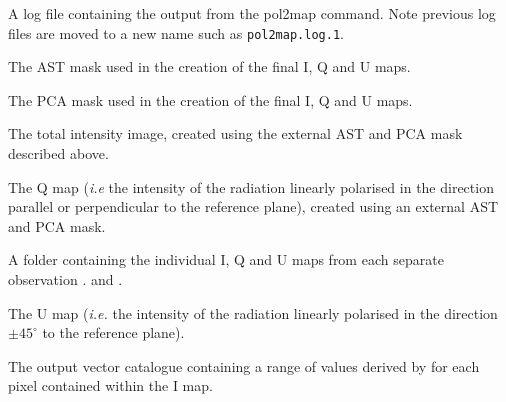 \begin{aligndesc}
\item[\file{pol2map.log}] A log file containing the output from the
  pol2map command. Note previous log files are moved to a new name
  such as \texttt{pol2map.log.1}.

\item[\file{astmask.sdf}] The AST mask used in the creation
  of the final I, Q and U maps.

\item[\file{pcamask.sdf}] The PCA mask used in the creation of the
  final I, Q and U maps.

\item[\file{iext.sdf}] The total intensity image, created using the
  external AST and PCA mask described above.

\item[\file{qext.sdf}] The Q map (\emph{i.e} the intensity of the radiation
  linearly polarised in the direction parallel or perpendicular to the
  reference plane), created using an external AST and PCA mask.

\item[\file{maps/}] A folder containing the individual I, Q and U
  maps from each separate observation .
   and .

\item[\file{uext.sdf}] The U map (\emph{i.e.} the intensity of the radiation
  linearly polarised in the direction $\pm45^{\circ }$ to the reference plane).

\item[\file{mycat.FIT}] The output vector catalogue containing a
  range of values derived by  for each pixel contained within
  the I map.

\end{aligndesc}


